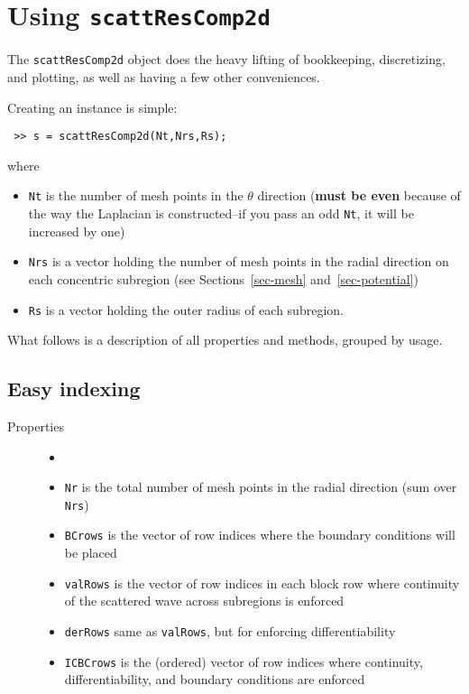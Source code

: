 \section{Using {\tt scattResComp2d}}
\label{sec-scattResComp2d}

The {\tt scattResComp2d} object does the heavy lifting of
bookkeeping, discretizing, and plotting, as well as
having a few other conveniences.

Creating an instance is simple: 
\begin{verbatim}
 >> s = scattResComp2d(Nt,Nrs,Rs);
\end{verbatim}
where
\begin{itemize}
 \item {\tt Nt} is the number of mesh points in the $\theta$
                 direction ({\bf must be even} because of the way
                 the Laplacian is constructed--if you pass an odd
                 {\tt Nt}, it will be increased by one)
 \item {\tt Nrs} is a vector holding the number of mesh points in
                 the radial direction on each concentric subregion
                 (see Sections~\ref{sec-mesh} and~\ref{sec-potential})
 \item {\tt Rs} is a vector holding the outer radius of each
                 subregion.
\end{itemize}
What follows is a description of all properties and methods, grouped
by usage.

\subsection{Easy indexing}
\label{sec-scattResComp2d-indexing}

\begin{description}
 \item[Properties]
   \begin{itemize}
    \item[] %
    \item {\tt Nr} is the total number of mesh points in the 
                 radial direction (sum over {\tt Nrs})
    \item {\tt BCrows} is the vector of row indices where the boundary
                 conditions will be placed
    \item {\tt valRows} is the vector of row indices in each block row
                 where continuity of the scattered wave 
                 across subregions is enforced
    \item {\tt derRows} same as {\tt valRows}, but for enforcing
                 differentiability
    \item {\tt ICBCrows} is the (ordered) vector of row indices where
                 continuity, differentiability, and boundary
                 conditions are enforced
   \end{itemize}
\end{description}

